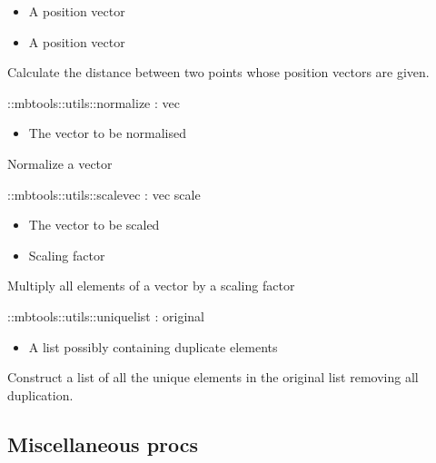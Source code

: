 \begin{itemize}
          \item {} A position vector
          \item {} A position vector
\end{itemize}
Calculate the distance between two points whose position vectors are given.
\begin{code}    
  ::mbtools::utils::normalize : vec
\end{code}
\begin{itemize}
          \item {} The vector to be normalised
\end{itemize}
Normalize a vector
\begin{code}    
  ::mbtools::utils::scalevec : vec scale
\end{code}
\begin{itemize}
          \item {} The vector to be scaled
          \item {} Scaling factor
\end{itemize}
Multiply all elements of a vector by a scaling factor
\begin{code}    
  ::mbtools::utils::uniquelist : original
\end{code}
\begin{itemize}
          \item {} A list possibly containing duplicate elements
\end{itemize}
Construct a list of all the unique elements in the original list removing all duplication.

\subsection{Miscellaneous procs}

